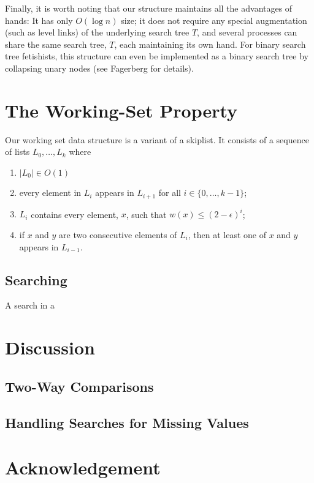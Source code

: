 \documentclass{patmorin}
\begin{document}
Finally, it is worth noting that our structure maintains all the
advantages of hands: It has only $O(\log n)$ size; it does not require
any special augmentation (such as level links) of the underlying search
tree $T$, and several processes can share the same search tree, $T$,
each maintaining its own hand.  For binary search tree fetishists, this
structure can even be implemented as a binary search tree by collapsing
unary nodes (see Fagerberg \cite{fXX} for details).


\section{The Working-Set Property}

Our working set data structure is a variant of a skiplist.  It consists of a sequence of lists $L_0,\ldots,L_k$ where
\begin{enumerate}
  \item $|L_0|\in O(1)$
  \item every element in $L_i$ appears in $L_{i+1}$ for all
  $i\in\{0,\ldots,k-1\}$;
  \item $L_i$ contains every element, $x$, such that $w(x)\le (2-\epsilon)^i$;
  \item if $x$ and $y$ are two consecutive elements of $L_i$, then at
  least one of $x$ and $y$ appears in $L_{i-1}$.
\end{enumerate}

\subsection{Searching}

A search in a

\section{Discussion}

\subsection{Two-Way Comparisons}

\subsection{Handling Searches for Missing Values}

\section*{Acknowledgement}
\end{document}

